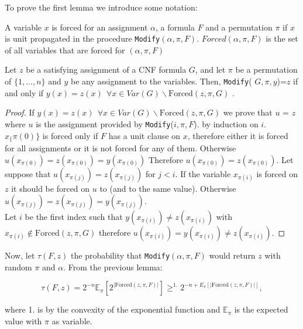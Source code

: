 To prove the first lemma we introduce some notation:

\begin{definition}
  A variable $x$ is forced for an assignment $\alpha$, a formula $F$ and a permutation $\pi$ if $x$ is unit propagated in the procedure \texttt{Modify}$(\alpha, \pi, F)$. $Forced(\alpha, \pi, F)$ is the set of all variables that are forced for $(\alpha, \pi, F)$
\end{definition}

\begin{lemma} Let $z$ be a satisfying assignment of a CNF formula $G$, and let $\pi$ be a permutation of 
$\{1,...,n\}$ and $y$ be any assignment to the variables. Then,
  \texttt{Modify}( $G,\pi,y$)=$z$ if and only if $y(x) = z(x)\ \  \forall x \in Var(G) \backslash \text{Forced}(z, \pi, G)$ .
\end{lemma}

\begin{proof}
  
  If $y(x) = z(x)\ \  \forall x \in Var(G) \backslash \text{Forced}(z, \pi, G)$ we prove that $u$ = $z$ where $u$ is the assignment provided by  \texttt{Modify}($i,\pi,F$). by induction on $i$.  $x_\{\pi(0)\}$ is forced only if $F$ has a unit clause on $x$, therefore either it is forced for all assignments or it is not forced for any of them. Otherwise $u(x_{\pi(0)}) = z(x_{\pi(0)})= y(x_{\pi(0)})$ Therefore $u(x_{\pi(0)}) = z(x_{\pi(0)})$. Let suppose that $u(x_{\pi(j)}) = z(x_{\pi(j)})$ for $j < i$. If the variable $x_{\pi(i)}$ is forced on $z$ it should be forced on $u$ to (and to the same value). Otherwise $u(x_{\pi(j)}) = z(x_{\pi(j)})= y(x_{\pi(j)})$. \\

  Let $i$ be the first index such that $y(x_{\pi(i)})\ne z(x_{\pi(i)})$ with $x_{\pi(i)} \not \in \text{Forced}(z, \pi, G)$ therefore $u(x_{\pi(i)})=y(x_{\pi(i)})\ne z(x_{\pi(i)})$.
\end{proof}

Now, let $\tau (F,z)$ the probability that \texttt{Modify}$(\alpha,\pi,F)$ would return $z$ with random $\pi$ and $\alpha$. From the previous lemma:

$$ \tau(F,z) = 2^{-n} \mathbb{E}_{\pi}[2^{|\text{Forced}(z, \pi, F)|}] \ge^{1.} 2^{-n +E_{\pi}[{|\text{Forced}(z, \pi, F)|}] },$$

where 1. is by the convexity of the exponential function and $\mathbb{E}_{\pi}$ is the expected value with $\pi$ as variable. \\

